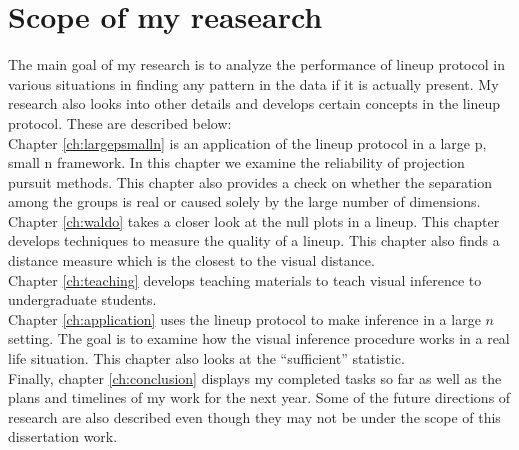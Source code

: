 \documentclass[12]{report}
\begin{document}
\section{Scope of my reasearch}

The main goal of my research is to analyze the performance of lineup protocol in various situations in finding any pattern in the data if it is actually present. My research also looks into other details and develops certain concepts in the lineup protocol. These are described below:\\

Chapter \ref{ch:largepsmalln} is an application of the lineup protocol in a large p, small n framework. In this chapter we examine the reliability of projection pursuit methods. This chapter also provides a check on whether the separation among the groups is real or caused solely by the large number of dimensions. \\

Chapter \ref{ch:waldo} takes a closer look at the null plots in a lineup. This chapter develops techniques to measure the quality of a lineup. This chapter also finds a distance measure which is the closest to the visual distance. \\

Chapter \ref{ch:teaching} develops teaching materials to teach visual inference to undergraduate students.  \\

Chapter \ref{ch:application} uses the lineup protocol to make inference in a large $n$ setting. The goal is to examine how the visual inference procedure works in a real life situation. This chapter also looks at the ``sufficient'' statistic. \\

Finally, chapter \ref{ch:conclusion} displays my completed tasks so far as well as the plans and timelines of my work for the next year. Some of the future directions of research are also described even though they may not be under the scope of this dissertation work.
\end{document}
